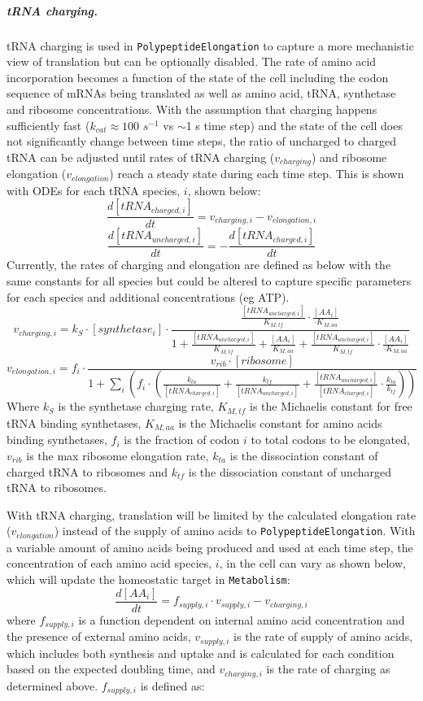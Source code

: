 \documentclass[12pt]{article}
\begin{document}
\subparagraph{tRNA charging.}
tRNA charging is used in \texttt{PolypeptideElongation} to capture a more mechanistic view of translation but can be optionally disabled.  The rate of amino acid incorporation becomes a function of the state of the cell including the codon sequence of mRNAs being translated as well as amino acid, tRNA, synthetase and ribosome concentrations.  With the assumption that charging happens sufficiently fast ($k_{cat} \approx 100$ $s^{-1}$ vs $\sim$1 s time step) and the state of the cell does not significantly change between time steps, the ratio of uncharged to charged tRNA can be adjusted until rates of tRNA charging ($v_{charging}$) and ribosome elongation ($v_{elongation}$) reach a steady state during each time step.  This is shown with ODEs for each tRNA species, $i$, shown below:
\[\frac{d[tRNA_{charged,i}]}{dt} = v_{charging,i} - v_{elongation,i}\]
\[\frac{d[tRNA_{uncharged,i}]}{dt} = -\frac{d[tRNA_{charged,i}]}{dt}\]
Currently, the rates of charging and elongation are defined as below with the same constants for all species but could be altered to capture specific parameters for each species and additional concentrations (eg ATP).
\[v_{charging,i} = k_{S}\cdot[synthetase_i]\cdot\frac{\frac{[tRNA_{uncharged,i}]}{K_{M,tf}}\cdot\frac{[AA_i]}{\cdot K_{M,aa}}}{1 + \frac{[tRNA_{uncharged,i}]}{K_{M,tf}} + \frac{[AA_i]}{K_{M,aa}} + \frac{[tRNA_{uncharged,i}]}{K_{M,tf}}\cdot\frac{[AA_i]}{\cdot K_{M,aa}}}\]
\[v_{elongation,i} = f_i\cdot\frac{v_{rib}\cdot[ribosome]}{1 + \sum\limits_i(f_i\cdot(\frac{k_{ta}}{[tRNA_{charged,i}]} + \frac{k_{tf}}{[tRNA_{uncharged,i}]} + \frac{[tRNA_{uncharged,i}]}{[tRNA_{charged,i}]}\cdot\frac{k_{ta}}{k_{tf}}))}\]
Where $k_S$ is the synthetase charging rate, $K_{M,tf}$ is the Michaelis constant for free tRNA binding synthetases, $K_{M,aa}$ is the Michaelis constant for amino acids binding synthetases, $f_i$ is the fraction of codon $i$ to total codons to be elongated, $v_{rib}$ is the max ribosome elongation rate, $k_{ta}$ is the dissociation constant of charged tRNA to ribosomes and $k_{tf}$ is the dissociation constant of uncharged tRNA to ribosomes.

With tRNA charging, translation will be limited by the calculated elongation rate ($v_{elongation}$) instead of the supply of amino acids to \texttt{PolypeptideElongation}.  With a variable amount of amino acids being produced and used at each time step, the concentration of each amino acid species, $i$, in the cell can vary as shown below, which will update the homeostatic target in \texttt{Metabolism}:
\[\frac{d[AA_i]}{dt} = f_{supply,i}\cdot v_{supply,i} - v_{charging,i}\]
where $f_{supply,i}$ is a function dependent on internal amino acid concentration and the presence of external amino acids, $v_{supply,i}$ is the rate of supply of amino acids, which includes both synthesis and uptake and is calculated for each condition based on the expected doubling time, and $v_{charging,i}$ is the rate of charging as determined above.  $f_{supply,i}$ is defined as:
\end{document}
